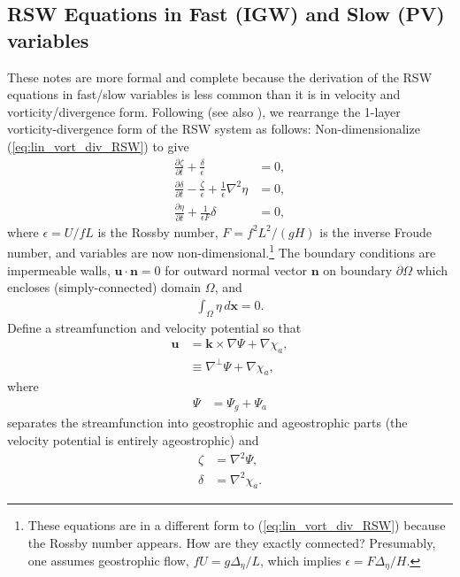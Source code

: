 \documentclass[10pt,reqno]{amsart}
\newcommand{\kk}{{\mathbf k}}
\newcommand{\nn}{{\mathbf n}}
\newcommand{\uu}{{\mathbf u}}
\newcommand{\x}{{\mathbf x}}
\begin{document}
\subsection{RSW Equations in Fast (IGW) and Slow (PV) variables}
\label{sect:fast_slow}
These notes are more formal and complete because the derivation of the RSW equations in fast/slow variables is less common than it is in velocity and vorticity/divergence form.
Following \citet{ring09} (see also \citealt{jones02}), we rearrange the 1-layer vorticity-divergence form of the RSW system as follows:
Non-dimensionalize (\ref{eq:lin_vort_div_RSW}) to give
\begin{align}
\frac{\partial \zeta}{\partial t }    +  \frac{ \delta}{\epsilon} &= 0  , \\
\frac{\partial \delta}{\partial t }   - \frac{\zeta}{\epsilon} + \frac{1}{\epsilon} \nabla^2 \eta & = 0 ,   \\
\frac{\partial \eta}{\partial t }  + \frac{1}{\epsilon F} \delta &= 0   ,
\label{eqn:lin_vort_div_RSW_nondim}
\end{align}
where $\epsilon = U/ f L$ is the Rossby number, $F= f^2 L^2 / (g H)$ is the inverse Froude number, and variables are now non-dimensional.\footnote{These equations are in a different form to (\ref{eq:lin_vort_div_RSW}) because the Rossby number appears. How are they exactly connected?   
Presumably, one assumes geostrophic flow, $f U = g \Delta_\eta / L$, which implies $\epsilon = F \Delta_\eta / H $.
} 
The boundary conditions are impermeable walls, $\uu \cdot \nn = 0$ for outward normal vector $\nn$ on boundary ${\partial \Omega}$ which encloses (simply-connected) domain $\Omega$, and 
\begin{align}
\int_\Omega \eta \, d \x = 0 .
\end{align}
Define a streamfunction and velocity potential so that
\begin{align}
\uu &= \kk \times \nabla \Psi + \nabla \chi_a , \nonumber \\
& \equiv  \nabla^\perp \Psi + \nabla \chi_a , 
\end{align}
where
\begin{align}
 \Psi & = \Psi_g + \Psi_a
\end{align}
separates the streamfunction into geostrophic and ageostrophic parts (the velocity potential is entirely ageostrophic) and
\begin{align}
\zeta & = \nabla^2 \Psi ,\\
\delta & = \nabla^2 \chi_a .
\end{align}
\end{document}
